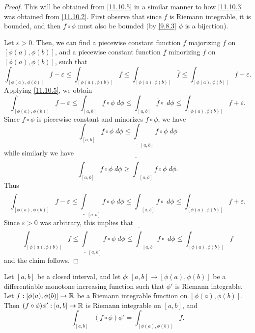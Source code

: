 \begin{proof}
  This will be obtained from \cref{11.10.5} in a similar manner to how \cref{11.10.3} was obtained from \cref{11.10.2}.
  First observe that since \(f\) is Riemann integrable, it is bounded, and then \(f \circ \phi\) must also be bounded (by \cref{9.8.3} \(\phi\) is a bijection).

  Let \(\varepsilon > 0\).
  Then, we can find a piecewise constant function \(\overline{f}\) majorizing \(f\) on \([\phi(a), \phi(b)]\), and a piecewise constant function \(\underline{f}\) minorizing \(f\) on \([\phi(a), \phi(b)]\), such that
  \[
    \int_{[\phi(a), \phi(b)]} f - \varepsilon \leq \int_{[\phi(a), \phi(b)]} \underline{f} \leq \int_{[\phi(a), \phi(b)]} \overline{f} \leq \int_{[\phi(a), \phi(b)]} f + \varepsilon.
  \]
  Applying \cref{11.10.5}, we obtain
  \[
    \int_{[\phi(a), \phi(b)]} f - \varepsilon \leq \int_{[a, b]} \underline{f} \circ \phi \; d \phi \leq \int_{[a, b]} \overline{f} \circ \; d \phi \leq \int_{[\phi(a), \phi(b)]} f + \varepsilon.
  \]
  Since \(\underline{f} \circ \phi\) is piecewise constant and minorizes \(f \circ \phi\), we have
  \[
    \int_{[a, b]} \underline{f} \circ \phi \; d \phi \leq \underline{\int}_{[a, b]} f \circ \phi \; d \phi
  \]
  while similarly we have
  \[
    \int_{[a, b]} \overline{f} \circ \phi \; d \phi \geq \overline{\int}_{[a, b]} f \circ \phi \; d \phi.
  \]
  Thus
  \[
    \int_{[\phi(a), \phi(b)]} f - \varepsilon \leq \underline{\int}_{[a, b]} f \circ \phi \; d \phi \leq \overline{\int}_{[a, b]} f \circ \; d \phi \leq \int_{[\phi(a), \phi(b)]} f + \varepsilon.
  \]
  Since \(\varepsilon > 0\) was arbitrary, this implies that
  \[
    \int_{[\phi(a), \phi(b)]} f \leq \underline{\int}_{[a, b]} f \circ \phi \; d \phi \leq \overline{\int}_{[a, b]} f \circ \; d \phi \leq \int_{[\phi(a), \phi(b)]} f
  \]
  and the claim follows.
\end{proof}

\begin{prop}\label{11.10.7}
  Let \([a, b]\) be a closed interval, and let \(\phi : [a, b] \to [\phi(a), \phi(b)]\) be a differentiable monotone increasing function such that \(\phi'\) is Riemann integrable.
  Let \(f : [\phi(a), \phi(b)] \to \mathbb{R}\) be a Riemann integrable function on \([\phi(a), \phi(b)]\).
  Then \((f \circ \phi) \phi' : [a, b] \to \mathbb{R}\) is Riemann integrable on \([a, b]\), and
  \[
    \int_{[a, b]} (f \circ \phi) \phi' = \int_{[\phi(a), \phi(b)]} f.
  \]
\end{prop}

